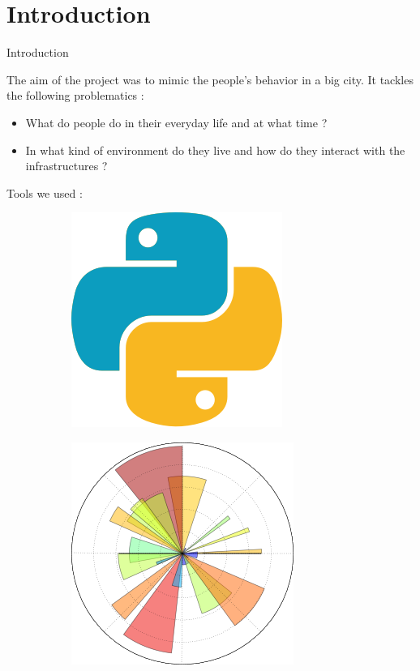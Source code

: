\section{Introduction}

\begin{frame}[fragile]{Introduction}
	
	The aim of the project was to mimic the people's behavior in a big city. It tackles the following problematics :
	\begin{itemize}
		\item What do people do in their everyday life and at what time ?
		\item In what kind of environment do they live and how do they interact with the infrastructures ?
	\end{itemize}
	Tools we used :
	\begin{figure}
		\centering
		\begin{subfigure}{.24\textwidth}
			\centering
			\includegraphics[width=.5\linewidth]{images/python.png}
		\end{subfigure}%
		\begin{subfigure}{.24\textwidth}
			\centering
			\includegraphics[width=.5\linewidth]{images/matplotlib.png}
		\end{subfigure}%

\end{figure}
\end{frame}

